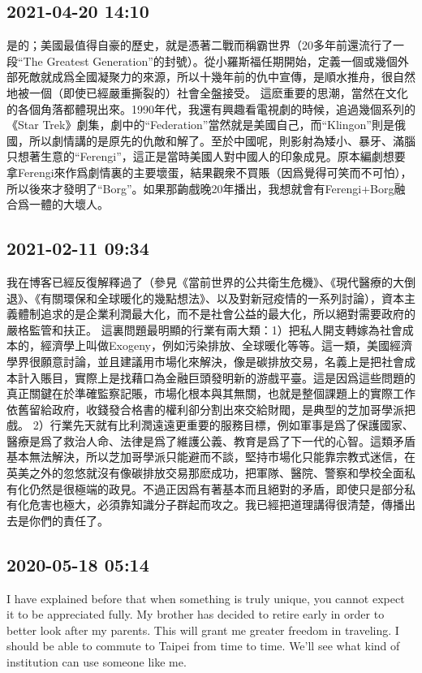\documentclass[twocolumn]{ctexart}
\begin{document}
\subsection*{2021-04-20 14:10}

是的；美國最值得自豪的歷史，就是憑著二戰而稱霸世界（20多年前還流行了一段“The Greatest Generation”的封號）。從小羅斯福任期開始，定義一個或幾個外部死敵就成爲全國凝聚力的來源，所以十幾年前的仇中宣傳，是順水推舟，很自然地被一個（即使已經嚴重撕裂的）社會全盤接受。
這麽重要的思潮，當然在文化的各個角落都體現出來。1990年代，我還有興趣看電視劇的時候，追過幾個系列的《Star Trek》劇集，劇中的“Federation”當然就是美國自己，而“Klingon”則是俄國，所以劇情講的是原先的仇敵和解了。至於中國呢，則影射為矮小、暴牙、滿腦只想著生意的“Ferengi”，這正是當時美國人對中國人的印象成見。原本編劇想要拿Ferengi來作爲劇情裏的主要壞蛋，結果觀衆不買賬（因爲覺得可笑而不可怕），所以後來才發明了“Borg”。如果那齣戲晚20年播出，我想就會有Ferengi+Borg融合爲一體的大壞人。
\subsection*{2021-02-11 09:34}

我在博客已經反復解釋過了（參見《當前世界的公共衛生危機》、《現代醫療的大倒退》、《有關環保和全球暖化的幾點想法》、以及對新冠疫情的一系列討論），資本主義體制追求的是企業利潤最大化，而不是社會公益的最大化，所以絕對需要政府的嚴格監管和扶正。
這裏問題最明顯的行業有兩大類：1）把私人開支轉嫁為社會成本的，經濟學上叫做Exogeny，例如污染排放、全球暖化等等。這一類，美國經濟學界很願意討論，並且建議用市場化來解決，像是碳排放交易，名義上是把社會成本計入賬目，實際上是找藉口為金融巨頭發明新的游戲平臺。這是因爲這些問題的真正關鍵在於準確監察記賬，市場化根本與其無關，也就是整個課題上的實際工作依舊留給政府，收錢發合格書的權利卻分割出來交給財閥，是典型的芝加哥學派把戲。
2）行業先天就有比利潤遠遠更重要的服務目標，例如軍事是爲了保護國家、醫療是爲了救治人命、法律是爲了維護公義、教育是爲了下一代的心智。這類矛盾基本無法解決，所以芝加哥學派只能避而不談，堅持市場化只能靠宗教式迷信，在英美之外的忽悠就沒有像碳排放交易那麽成功，把軍隊、醫院、警察和學校全面私有化仍然是很極端的政見。不過正因爲有著基本而且絕對的矛盾，即使只是部分私有化危害也極大，必須靠知識分子群起而攻之。我已經把道理講得很清楚，傳播出去是你們的責任了。
\subsection*{2020-05-18 05:14}

I have explained before that when something is truly unique, you cannot expect it to be appreciated fully.
My brother has decided to retire early in order to better look after my parents. This will grant me greater freedom in traveling. I should be able to commute to Taipei from time to time. We'll see what kind of institution can use someone like me.
\end{document}
